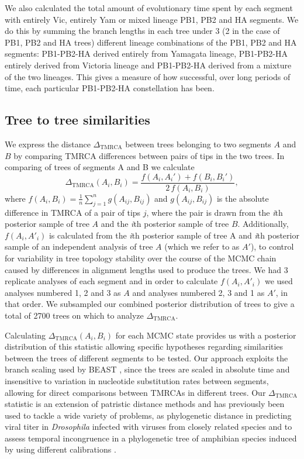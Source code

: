 \documentclass[11pt,oneside,letterpaper]{article}
\newcommand{\dtmrca}{\Delta_\mathrm{TMRCA}}
\begin{document}
We also calculated the total amount of evolutionary time spent by each segment with entirely Vic, entirely Yam or mixed lineage PB1, PB2 and HA segments.
We do this by summing the branch lengths in each tree under 3 (2 in the case of PB1, PB2 and HA trees) different lineage combinations of the PB1, PB2 and HA segments: PB1-PB2-HA derived entirely from Yamagata lineage, PB1-PB2-HA entirely derived from Victoria lineage and PB1-PB2-HA derived from a mixture of the two lineages.
This gives a measure of how successful, over long periods of time, each particular PB1-PB2-HA constellation has been.

\subsection*{Tree to tree similarities}

We express the distance $\dtmrca$ between trees belonging to two segments $A$ and $B$ by comparing TMRCA differences between pairs of tips in the two trees.
In comparing of trees of segments A and B we calculate
\begin{equation}
\dtmrca(A_i, B_i) = \frac{f(A_i, A_i') + f(B_i, B_i')}{2 \, f(A_i, B_i)},
\end{equation}
where $f(A_i, B_i) = \frac{1}{n}\sum_{j=1}^n g(A_{ij}, B_{ij})$ and $g(A_{ij},B_{ij})$ is the absolute difference in TMRCA of a pair of tips $j$, where the pair is drawn from the \textit{i}th posterior sample of tree $A$ and the \textit{i}th posterior sample of tree $B$.
Additionally, $f(A_i,A'_i)$ is calculated from the \textit{i}th posterior sample of tree A and \textit{i}th posterior sample of an independent analysis of tree $A$ (which we refer to as $A'$), to control for variability in tree topology stability over the course of the MCMC chain caused by differences in alignment lengths used to produce the trees.
We had 3 replicate analyses of each segment and in order to calculate $f(A_i,A'_i)$ we used analyses numbered 1, 2 and 3 as $A$ and analyses numbered 2, 3 and 1 as $A'$, in that order.
We subsampled our combined posterior distribution of trees to give a total of 2700 trees on which to analyze $\dtmrca$.

Calculating $\dtmrca(A_i, B_i)$ for each MCMC state provides us with a posterior distribution of this statistic allowing  specific hypotheses regarding similarities between the trees of different segments to be tested.
Our approach exploits the branch scaling used by BEAST \cite{drummond2012}, since the trees are scaled in absolute time and insensitive to variation in nucleotide substitution rates between segments, allowing for direct comparisons between TMRCAs in different trees.
Our $\dtmrca$ statistic is an extension of patristic distance methods and has previously been used to tackle a wide variety of problems, as phylogenetic distance in predicting viral titer in \textit{Drosophila} infected with viruses from closely related species \cite{longdon2011} and to assess temporal incongruence in a phylogenetic tree of amphibian species induced by using different calibrations \cite{ruane2011}.
\end{document}
